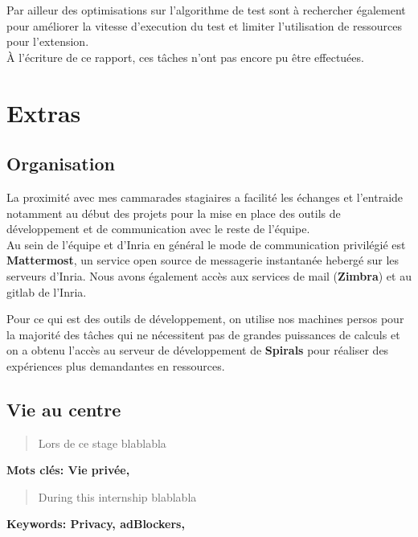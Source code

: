 \documentclass[oneside,a4paper,12pt]{article}
\begin{document}
Par ailleur des optimisations sur l'algorithme de test sont à rechercher également pour améliorer la vitesse d'execution du test et limiter l'utilisation de ressources pour l'extension.\\

\`A l'écriture de ce rapport, ces tâches n'ont pas encore pu être effectuées.

\section{Extras}

\subsection{Organisation}

La proximité avec mes cammarades stagiaires a facilité les échanges et l'entraide notamment au début des projets pour la mise en place des outils de développement et de communication avec le reste de l'équipe.\\

Au sein de l'équipe et d'Inria en général le mode de communication privilégié est \textbf{Mattermost}, un service open source de messagerie instantanée hebergé sur les serveurs d'Inria. Nous avons également accès aux services de mail (\textbf{Zimbra}) et au gitlab de l'Inria.

Pour ce qui est des outils de développement, on utilise nos machines persos pour la majorité des tâches qui ne nécessitent pas de grandes puissances de calculs et on a obtenu l'accès au serveur de développement de \textbf{Spirals} pour réaliser des expériences plus demandantes en ressources.

\subsection{Vie au centre}

\newpage

\appendix
\printbibliography

\newpage

\begin{center}
	
	\vspace{2cm}
	\renewcommand{\abstractname}{Résumé}
	\begin{abstract}
	
	Lors de ce stage blablabla

	\end{abstract}
	\textbf{Mots clés: Vie privée, }
	\vspace{\fill}	
	\renewcommand{\abstractname}{Abstract}
	\begin{abstract}
	
	During this internship blablabla

	\end{abstract}
	\textbf{Keywords: Privacy, adBlockers, }
	\vspace{2cm}

\end{center}
\end{document}
